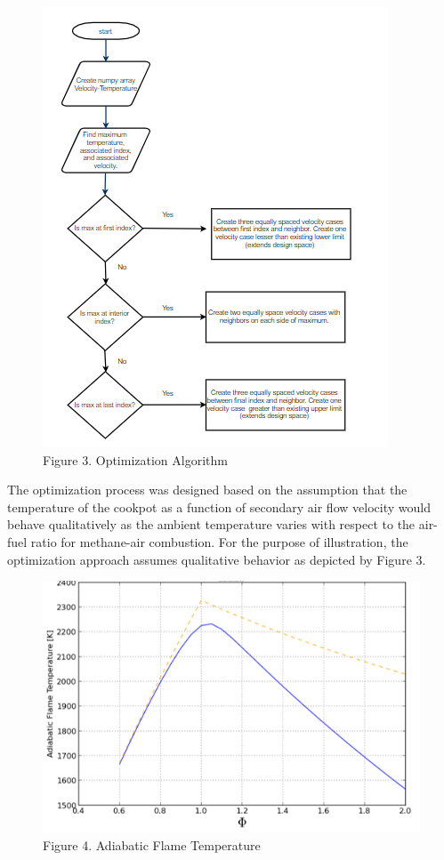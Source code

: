 \documentclass[3p,times,twocolumn]{elsarticle}
\begin{document}
\begin{figure}{\linewidth}
	\includegraphics[width=\linewidth]{algorithm.PNG}
	\caption{Figure 3. Optimization Algorithm}
\end{figure}



The optimization process was designed based on the assumption that the temperature of the cookpot as a function of secondary air flow velocity would behave qualitatively as the ambient temperature varies with respect to the air-fuel ratio for methane-air combustion. For the purpose of illustration, the optimization approach assumes qualitative behavior as depicted by Figure 3.

\begin{figure}{\linewidth}
	\includegraphics[width=\linewidth]{methair.png}
	\caption{Figure 4. Adiabatic Flame Temperature}
\end{figure}
\end{document}
